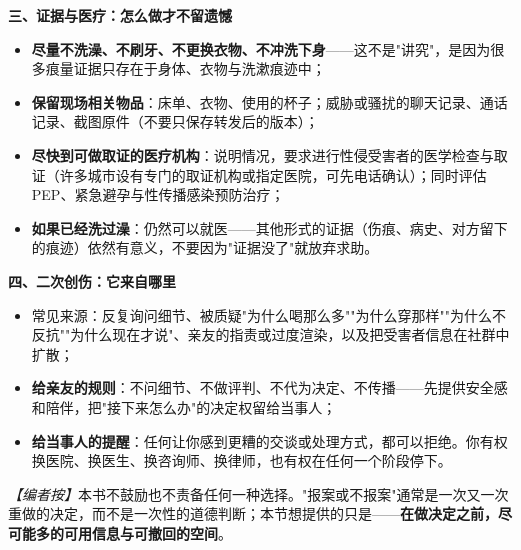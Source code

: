 \textbf{三、证据与医疗：怎么做才不留遗憾}
\begin{itemize}
\item \textbf{尽量不洗澡、不刷牙、不更换衣物、不冲洗下身}——这不是"讲究"，是因为很多痕量证据只存在于身体、衣物与洗漱痕迹中；
\item \textbf{保留现场相关物品}：床单、衣物、使用的杯子；威胁或骚扰的聊天记录、通话记录、截图原件（不要只保存转发后的版本）；
\item \textbf{尽快到可做取证的医疗机构}：说明情况，要求进行性侵受害者的医学检查与取证（许多城市设有专门的取证机构或指定医院，可先电话确认）；同时评估 PEP、紧急避孕与性传播感染预防治疗；
\item \textbf{如果已经洗过澡}：仍然可以就医——其他形式的证据（伤痕、病史、对方留下的痕迹）依然有意义，不要因为"证据没了"就放弃求助。
\end{itemize}

\textbf{四、二次创伤：它来自哪里}
\begin{itemize}
\item 常见来源：反复询问细节、被质疑"为什么喝那么多""为什么穿那样""为什么不反抗""为什么现在才说"、亲友的指责或过度渲染，以及把受害者信息在社群中扩散；
\item \textbf{给亲友的规则}：不问细节、不做评判、不代为决定、不传播——先提供安全感和陪伴，把"接下来怎么办"的决定权留给当事人；
\item \textbf{给当事人的提醒}：任何让你感到更糟的交谈或处理方式，都可以拒绝。你有权换医院、换医生、换咨询师、换律师，也有权在任何一个阶段停下。
\end{itemize}

\noindent\textit{【编者按】}本书不鼓励也不责备任何一种选择。"报案或不报案"通常是一次又一次重做的决定，而不是一次性的道德判断；本节想提供的只是——\textbf{在做决定之前，尽可能多的可用信息与可撤回的空间}。
